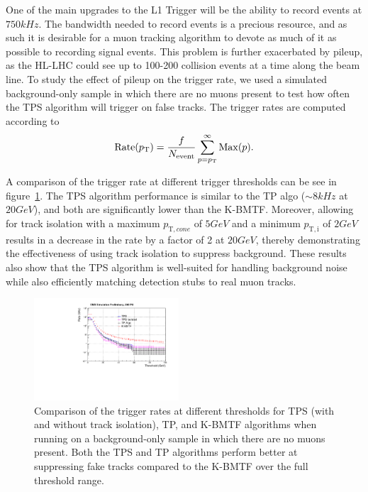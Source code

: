 One of the main upgrades to the L1 Trigger will be the ability to record events at $750\unit{kHz}$.
The bandwidth needed to record events is a precious resource, and as such it is desirable for a muon tracking algorithm to devote as much of it as possible to recording signal events.
This problem is further exacerbated by pileup, as the HL-LHC could see up to 100-200 collision events at a time along the beam line.
To study the effect of pileup on the trigger rate, we used a simulated background-only sample in which there are no muons present to test how often the TPS algorithm will trigger on false tracks.
The trigger rates are computed according to
\begin{equation}\label{eq:rate} %
  \mathrm{Rate}(\pt)=\frac{f}{N_\mathrm{event}}\sum_{p=\pt}^\infty\mathrm{Max}(p).
\end{equation}

A comparison of the trigger rate at different trigger thresholds can be see in figure~\ref{fig:rates}.
The TPS algorithm performance is similar to the TP algo ($\sim8\unit{kHz}$ at $20\unit{GeV}$), and both are significantly lower than the K-BMTF.
Moreover, allowing for track isolation with a maximum $p_{\mathrm{T},cone}$ of $5\unit{GeV}$ and a minimum $p_{\mathrm{T,i}}$ of $2\unit{GeV}$ results in a decrease in the rate by a factor of 2 at $20\unit{GeV}$, thereby demonstrating the effectiveness of using track isolation to suppress background.
These results also show that the TPS algorithm is well-suited for handling background noise while also efficiently matching detection stubs to real muon tracks.

\begin{figure}[htbp] %
  \centering
  \includegraphics[width=0.48\textwidth]{fig/TPS/rate.pdf}
  \caption{Comparison of the trigger rates at different \pt thresholds for TPS (with and without track isolation), TP, and K-BMTF algorithms when running on a background-only sample in which there are no muons present. Both the TPS and TP algorithms perform better at suppressing fake tracks compared to the K-BMTF over the full \pt threshold range.}
  \label{fig:rates}
\end{figure}

